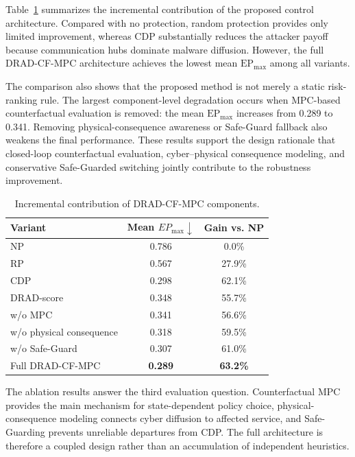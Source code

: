 \documentclass[lettersize,journal]{IEEEtran}
\newcommand{\best}[1]{\textbf{#1}}
\begin{document}
Table~\ref{tab:incremental_contribution} summarizes the incremental contribution of the proposed control architecture. Compared with no protection, random protection provides only limited improvement, whereas CDP substantially reduces the attacker payoff because communication hubs dominate malware diffusion. However, the full DRAD-CF-MPC architecture achieves the lowest mean $\mathrm{EP}_{\max}$ among all variants.

The comparison also shows that the proposed method is not merely a static risk-ranking rule. The largest component-level degradation occurs when MPC-based counterfactual evaluation is removed: the mean $\mathrm{EP}_{\max}$ increases from 0.289 to 0.341. Removing physical-consequence awareness or Safe-Guard fallback also weakens the final performance. These results support the design rationale that closed-loop counterfactual evaluation, cyber--physical consequence modeling, and conservative Safe-Guarded switching jointly contribute to the robustness improvement.

\begin{table}[!tbp]
\centering
\caption{Incremental contribution of DRAD-CF-MPC components.}
\label{tab:incremental_contribution}
\small
\begin{tabular}{lcc}
\toprule
\rowcolor{TableHeader}
Variant & Mean $EP_{\max}\downarrow$ & Gain vs. NP \\
\midrule
\rowcolor{RowWeak}
NP & 0.786 & 0.0\% \\
\rowcolor{RowNeutral}
RP & 0.567 & 27.9\% \\
\rowcolor{RowBaseline}
CDP & 0.298 & 62.1\% \\
\rowcolor{RowRisk}
DRAD-score & 0.348 & 55.7\% \\
\rowcolor{RowWeak}
w/o MPC & 0.341 & 56.6\% \\
\rowcolor{RowPhysical}
w/o physical consequence & 0.318 & 59.5\% \\
\rowcolor{RowScenario}
w/o Safe-Guard & 0.307 & 61.0\% \\
\rowcolor{RowProposed}
Full DRAD-CF-MPC & \best{0.289} & \best{63.2\%} \\
\bottomrule
\end{tabular}
\end{table}

The ablation results answer the third evaluation question. Counterfactual MPC provides the main mechanism for state-dependent policy choice, physical-consequence modeling connects cyber diffusion to affected service, and Safe-Guarding prevents unreliable departures from CDP. The full architecture is therefore a coupled design rather than an accumulation of independent heuristics.
\end{document}
